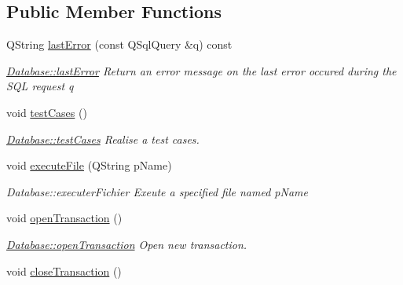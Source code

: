 \subsection*{Public Member Functions}
\begin{DoxyCompactItemize}
\item 
Q\+String \hyperlink{classDatabases_1_1Database_a00fcd95238619a41f7a734deaef3ea9f}{last\+Error} (const Q\+Sql\+Query \&q) const 
\begin{DoxyCompactList}\small\item\em \hyperlink{classDatabases_1_1Database_a00fcd95238619a41f7a734deaef3ea9f}{Database\+::last\+Error} Return an error message on the last error occured during the S\+Q\+L request {\itshape q} \end{DoxyCompactList}\item 
\hypertarget{classDatabases_1_1Database_a5029595698d889af5089428071c6ecda}{}void \hyperlink{classDatabases_1_1Database_a5029595698d889af5089428071c6ecda}{test\+Cases} ()\label{classDatabases_1_1Database_a5029595698d889af5089428071c6ecda}

\begin{DoxyCompactList}\small\item\em \hyperlink{classDatabases_1_1Database_a5029595698d889af5089428071c6ecda}{Database\+::test\+Cases} Realise a test cases. \end{DoxyCompactList}\item 
void \hyperlink{classDatabases_1_1Database_a21f6c86f95b149ac7dbf0ffc94021a93}{execute\+File} (Q\+String p\+Name)
\begin{DoxyCompactList}\small\item\em Database\+::executer\+Fichier Exeute a specified file named {\itshape p\+Name} \end{DoxyCompactList}\item 
\hypertarget{classDatabases_1_1Database_a64d55cd9452bbf2a6fd1693df004de59}{}void \hyperlink{classDatabases_1_1Database_a64d55cd9452bbf2a6fd1693df004de59}{open\+Transaction} ()\label{classDatabases_1_1Database_a64d55cd9452bbf2a6fd1693df004de59}

\begin{DoxyCompactList}\small\item\em \hyperlink{classDatabases_1_1Database_a64d55cd9452bbf2a6fd1693df004de59}{Database\+::open\+Transaction} Open new transaction. \end{DoxyCompactList}\item 
\hypertarget{classDatabases_1_1Database_a56faa5446bd58e6b3c3a4c503d9309b1}{}void \hyperlink{classDatabases_1_1Database_a56faa5446bd58e6b3c3a4c503d9309b1}{close\+Transaction} ()\label{classDatabases_1_1Database_a56faa5446bd58e6b3c3a4c503d9309b1}


\end{DoxyCompactItemize}
